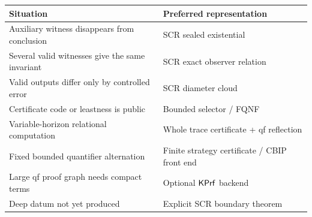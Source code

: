 \begin{center}
\begin{tabularx}{0.96\textwidth}{p{}X}
\toprule
Situation & Preferred representation \\
\midrule
Auxiliary witness disappears from conclusion & SCR sealed existential \\
Several valid witnesses give the same invariant & SCR exact observer relation \\
Valid outputs differ only by controlled error & SCR diameter cloud \\
Certificate code or leastness is public & Bounded selector / FQNF \\
Variable-horizon relational computation & Whole trace certificate + qf reflection \\
Fixed bounded quantifier alternation & Finite strategy certificate / CBIP front end \\
Large qf proof graph needs compact terms & Optional \(\mathsf{KPrf}\) backend \\
Deep datum not yet produced & Explicit SCR boundary theorem \\
\bottomrule
\end{tabularx}
\end{center}
